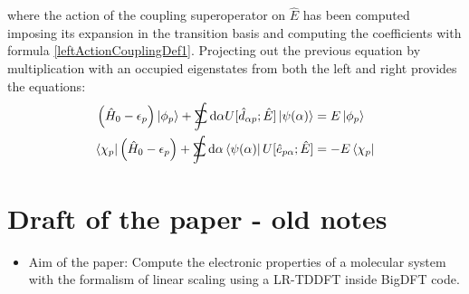 \documentclass[a4paper]{article}
\newcommand{\dd}{{\rm d}}
\newcommand{\eps}{\epsilon}
\newcommand{\sint}{\mathrlap{\displaystyle\int}
\mathrlap{\textstyle\sum}
\phantom{\mathrlap{\displaystyle
\int}\textstyle\sum}}
\newcommand{\nn}{\notag}
\newcommand{\op}[1]{\hat {#1}}
\newcommand{\hnot}{\op{H}_0}
\newcommand{\excite}[2]{\op e_{{#1}{#2}}}
\newcommand{\decay}[2]{\op d_{{#1}{#2}}}
\begin{document}
where the action of the coupling superoperator on $\op E$ has been computed imposing its expansion in the transition basis and computing the coefficients with formula 
\eqref{leftActionCouplingDef1}. Projecting out the previous equation by multiplication with an occupied eigenstates from both the left and right provides the equations:
\begin{align}
\left(\hnot-\eps_p\right)\ket{\phi_p} +\sint \dd\alpha  U[\decay{\alpha}{p}; \op E] \ket{\psi(\alpha)} &= E\ket{\phi_p} \nn \\
\bra{\chi_p}\left(\hnot-\eps_p\right) +\sint \dd\alpha \bra{\psi(\alpha)} U[\excite{p}{\alpha}; \op E] &= -E\bra{\chi_p} 
\end{align}


\section{Draft of the paper - old notes}

\begin{itemize}
\item Aim of the paper: Compute the electronic properties of a molecular system with the formalism of linear scaling using a LR-TDDFT inside BigDFT code. 
\end{itemize}
\end{document}
